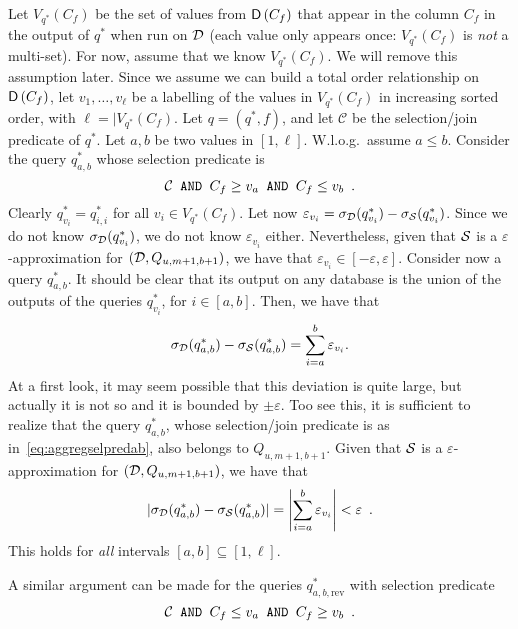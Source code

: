 Let $V_{q^*}(C_f)$ be the set of values from $\mathsf{D}\left(C_f\right)$ that appear in the
column $C_f$ in the output of $q^*$ when run on ${\cal D}$ (each value only appears
once:  $V_{q^*}(C_f)$ is \emph{not} a multi-set). For now, assume that we
know $V_{q^*}(C_f)$. We will remove this assumption later. Since we assume we
can build a total order relationship on $\mathsf{D}\left(C_f\right)$, let $v_1,\dotsc,v_\ell$
be a labelling of the values in $V_{q^*}(C_f)$ in increasing sorted order, with
$\ell=|V_{q^*}(C_f)$. Let
$q=(q^*,f)$, and let $\mathcal{C}$ be the selection/join predicate of $q^*$. Let
$a,b$ be two values in $[1,\ell]$. W.l.o.g.~assume $a\le b$. Consider the
query $q^*_{a,b}$ whose selection predicate is
\begin{equation}\label{eq:aggregselpredab}
\mathcal{C} \text{\texttt{ AND }} C_f \ge v_a \text{\texttt{ AND }} C_f \le v_b\enspace.
\end{equation}
Clearly $q^*_{v_i}=q^*_{i,i}$ for all $v_i\in V_{q^*}(C_f)$. Let now
$\varepsilon_{v_i}=\sigma_{\cal D}(q^*_{v_i})-\sigma_{\cal S}(q^*_{v_i})$. Since we
do not know $\sigma_{\cal D}(q^*_{v_i})$, we do not know $\varepsilon_{v_i}$ either.
Nevertheless, given that ${\cal S}$ is a $\varepsilon$-approximation for
$({\cal D},Q_{u,m+1,b+1})$, we have that
$\varepsilon_{v_i}\in[-\varepsilon,\varepsilon]$. Consider now a query $q^*_{a,b}$.
It should be clear that its output on any database is the union of the outputs
of the queries $q^*_{v_i}$, for $i\in[a,b]$. Then, we have that
\[
\sigma_{\cal D}(q^*_{a,b})-\sigma_{\cal S}(q^*_{a,b})=\sum_{i=a}^b\varepsilon_{v_i}.
\]
At a first look, it may seem possible that this deviation is quite large, but
actually it is not so and it is bounded by $\pm\varepsilon$. Too see this, it is
sufficient to realize that the query $q^*_{a,b}$, whose selection/join predicate
is as in~\eqref{eq:aggregselpredab}, also belongs to $Q_{u,m+1,b+1}$.
Given that ${\cal S}$ is a $\varepsilon$-approximation for $({\cal D},Q_{u,m+1,b+1})$, we
have that 
\begin{equation}\label{eq:constraints1}
|\sigma_{\cal D}(q^*_{a,b})-\sigma_{\cal S}(q^*_{a,b})|=\left|\sum_{i=a}^b\varepsilon_{v_i}\right|<\varepsilon\enspace.
\end{equation}
This holds for \emph{all} intervals $[a,b]\subseteq[1,\ell]$.

A similar argument can be made for the queries $q^*_{a,b,\mathrm{rev}}$ with
selection predicate
\[
\mathcal{C} \text{\texttt{ AND }} C_f \le v_a \text{\texttt{ AND }} C_f \ge v_b\enspace.
\]

